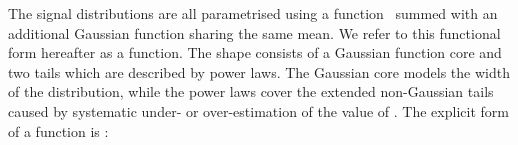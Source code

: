 The signal \mgg distributions are all parametrised using a \DCB function~\cite{CrystalBallFunction} summed with an additional Gaussian function sharing the same mean. We refer to this functional form hereafter as a \DCBpG function. %
The \DCB shape consists of a Gaussian function core and two tails which are described by power laws. The Gaussian core models the width of the distribution, while the power laws cover the extended non-Gaussian tails caused by systematic under- or over-estimation of the value of \mgg. %
The explicit form of a \DCB function is :

